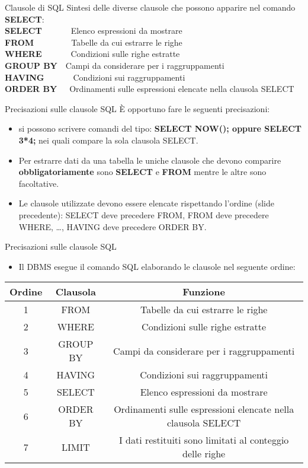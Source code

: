 \begin{frame}{Clausole di SQL}
Sintesi delle diverse clausole che possono apparire nel comando \textbf{SELECT}:
\newline
\\\textbf{SELECT}~~~~~~~Elenco espressioni da mostrare
\\\textbf{FROM}~~~~~~~~~Tabelle da cui estrarre le righe
\\\textbf{WHERE}~~~~~~~Condizioni sulle righe estratte
\\\textbf{GROUP BY}~~Campi da considerare per i raggruppamenti
\\\textbf{HAVING}~~~~~~~Condizioni sui raggruppamenti
\\\textbf{ORDER BY}~~~Ordinamenti sulle espressioni elencate nella clausola SELECT
\end{frame}
%
\begin{frame}{Precisazioni sulle clausole SQL}
\`E opportuno fare le seguenti precisazioni:
\begin{itemize}[<+->]
    \item si possono scrivere comandi del tipo: \textbf{SELECT NOW(); oppure SELECT 3*4;} nei quali compare la sola clausola SELECT.
    \item Per estrarre dati da una tabella le uniche clausole che devono comparire \textbf{obbligatoriamente} sono \textbf{SELECT} e \textbf{FROM} mentre le altre sono facoltative.
    \item Le clausole utilizzate devono essere elencate rispettando l'ordine (slide precedente):
    SELECT deve precedere FROM, FROM deve precedere WHERE, \ldots, HAVING deve precedere ORDER BY.
\end{itemize}
\end{frame}
%
\begin{frame}{Precisazioni sulle clausole SQL}
\begin{itemize}
    \item Il DBMS esegue il comando SQL elaborando le clausole nel seguente ordine:
\end{itemize}
\begin{center}
\begin{tabular}{|c|c|c|}
    \hline
    \rowcolor{cyan!30} \textbf{Ordine} & \textbf{Clausola} & \textbf{Funzione} \\
    \hline
    1 & FROM & Tabelle da cui estrarre le righe\\ \hline
    2 & WHERE & Condizioni sulle righe estratte\\ \hline
    3 & GROUP BY & Campi da considerare per i raggruppamenti\\ \hline
    4 & HAVING & Condizioni sui raggruppamenti\\ \hline
    5 & SELECT & Elenco espressioni da mostrare\\ \hline
    6 & ORDER BY & Ordinamenti sulle espressioni elencate nella clausola SELECT\\ \hline
    7 & LIMIT & I dati restituiti sono limitati al conteggio delle righe\\ \hline
\end{tabular}
\end{center}
\end{frame}